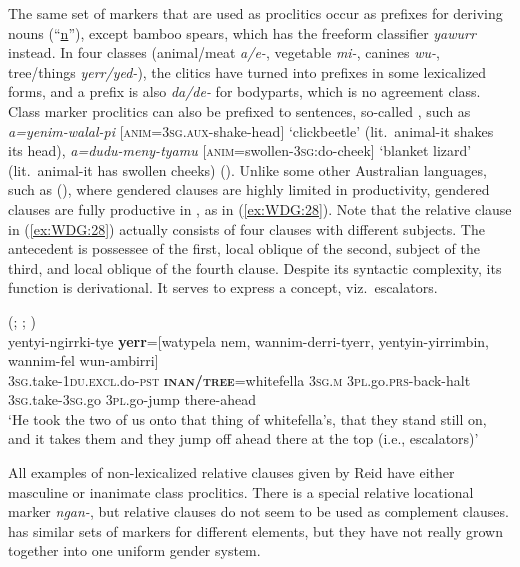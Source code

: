 \documentclass[output=collectionpaper]{langsci/langscibook}
\begin{document}
The same set of markers that are used as proclitics occur as prefixes for deriving nouns (``\uline{n}''), except bamboo spears, which has the freeform classifier \textit{yawurr} instead. In four classes (animal/meat \textit{a/e-}, vegetable \textit{mi-}, canines \textit{wu-}, tree/things \textit{yerr/yed-}), the clitics have turned into prefixes in some lexicalized forms, and a prefix is also \textit{da/de-} for bodyparts, which is no agreement class. Class marker proclitics can also be prefixed to sentences, so-called , such as \textit{a=yenim-walal-pi} [\textsc{anim=3sg.aux}-shake-head] `clickbeetle' (lit.\ animal-it shakes its head), \textit{a=dudu-meny-tyamu} [\textsc{anim}=swollen-3\textsc{sg}:do-cheek] `blanket lizard' (lit.\ animal-it has swollen cheeks) (\citealt[210]{Reid1997}). Unlike some other Australian languages, such as  (), where gendered clauses are highly limited in productivity, gendered clauses are fully productive in , as in (\ref{ex:WDG:28}). Note that the relative clause in (\ref{ex:WDG:28}) actually consists of four clauses with different subjects. The antecedent is possessee of the first, local oblique of the second, subject of the third, and local oblique of the fourth clause. Despite its syntactic complexity, its function is derivational. It serves to express a concept, viz.\ escalators.

\ea\label{ex:WDG:28}
  (; \citealt[380]{Reid1990}; \citealt[205]{Reid1997})\\
\gll yentyi-ngirrki-tye	\textbf{yerr}=[watypela 	nem, 	wannim-derri-tyerr, yentyin-yirrimbin, 	wannim-fel 	wun-ambirri]\\
\textsc{3sg}.take-\textsc{1du.excl}.do-\textsc{pst} 	\textbf{\textsc{inan/tree}}=whitefella 	\textsc{3sg.m} 	\textsc{3pl}.go.\textsc{prs}-back-halt \textsc{3sg}.take-\textsc{3sg}.go 	\textsc{3pl}.go-jump 	there-ahead\\
\glt `He took the two of us onto that thing of whitefella's, that they stand still on, and it takes them and they jump off ahead there at the top (i.e., escalators)'\\
\z

All examples of non-lexicalized relative clauses given by Reid have either masculine or inanimate class proclitics. There is a special relative locational marker \textit{ngan-}, but relative clauses do not seem to be used as complement clauses.  has similar sets of markers for different elements, but they have not really grown together into one uniform gender system.
\end{document}
